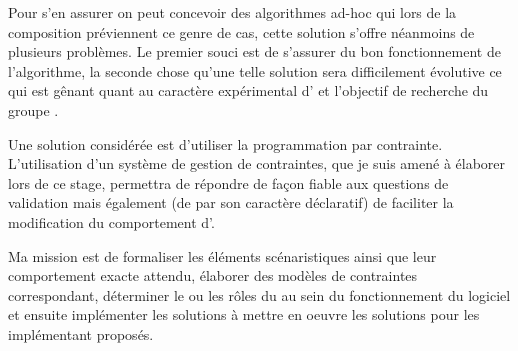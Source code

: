 Pour s'en assurer on peut concevoir des algorithmes ad-hoc qui lors de la composition préviennent ce genre de cas, cette solution s'offre néanmoins de plusieurs problèmes. Le premier souci est de s'assurer du bon fonctionnement de l'algorithme, la seconde chose qu'une telle solution sera difficilement évolutive ce qui est gênant quant au caractère expérimental d'\iscore{} et l'objectif de recherche du groupe \ossia{}.

Une solution considérée est d'utiliser la programmation par contrainte. L'utilisation d'un système de gestion de contraintes, que je suis amené à élaborer lors de ce stage, permettra de répondre de façon fiable aux questions de validation mais également (de par son caractère déclaratif) de faciliter la modification du comportement d'\iscore{}.

Ma mission est de formaliser les éléments scénaristiques ainsi que leur comportement exacte attendu, élaborer des modèles de contraintes correspondant, déterminer le ou les rôles du \csp{} au sein du fonctionnement du logiciel et ensuite implémenter les solutions à mettre en oeuvre les solutions pour les implémentant proposés.

\printglossary[type=\acronymtype]
 
\printglossary